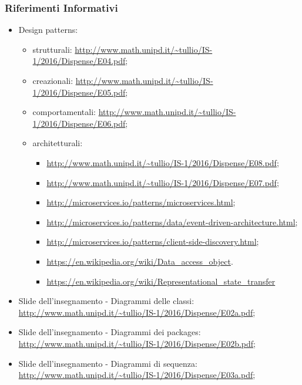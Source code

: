 	 \subsubsection{Riferimenti Informativi}
	  \begin{itemize}
	    \item Design patterns:
	      \begin{itemize}
	       \item strutturali:
	       \url{http://www.math.unipd.it/~tullio/IS-1/2016/Dispense/E04.pdf};
	       \item creazionali:
	       \url{http://www.math.unipd.it/~tullio/IS-1/2016/Dispense/E05.pdf};
	       \item comportamentali:
	       \url{http://www.math.unipd.it/~tullio/IS-1/2016/Dispense/E06.pdf};
	       \item architetturali:
	       \begin{itemize}
	       \item \url{http://www.math.unipd.it/~tullio/IS-1/2016/Dispense/E08.pdf};
	       \item \url{http://www.math.unipd.it/~tullio/IS-1/2016/Dispense/E07.pdf};
	       \item \url{http://microservices.io/patterns/microservices.html};
	       \item \url{http://microservices.io/patterns/data/event-driven-architecture.html};
	       \item \url{http://microservices.io/patterns/client-side-discovery.html};
	       \item \url{https://en.wikipedia.org/wiki/Data_access_object}.
	       \item \url{https://en.wikipedia.org/wiki/Representational_state_transfer}
	       \end{itemize}
	      \end{itemize}
	    \item Slide dell’insegnamento - Diagrammi delle classi:
	    \url{http://www.math.unipd.it/~tullio/IS-1/2016/Dispense/E02a.pdf};
	    \item Slide dell’insegnamento - Diagrammi dei packages:
	    \url{http://www.math.unipd.it/~tullio/IS-1/2016/Dispense/E02b.pdf};
	    \item Slide dell’insegnamento - Diagrammi di sequenza:
	    \url{http://www.math.unipd.it/~tullio/IS-1/2016/Dispense/E03a.pdf}; 
	  \end{itemize}
	  
	  
